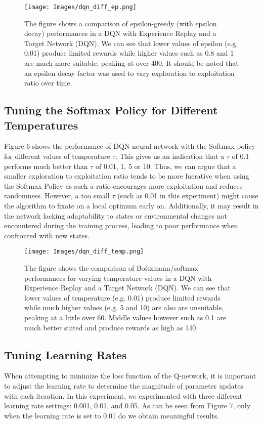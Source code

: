 \documentclass{article}
\begin{document}
\begin{figure}[H]
\centering
\texttt{[image: Images/dqn\_diff\_ep.png]}
\caption{\label{fig:Comparison of epsilon-greedy (with epsilon delay)} The figure shows a comparison of epsilon-greedy (with epsilon decay) performances in a DQN with Experience Replay and a Target Network (DQN). We can see that lower values of epsilon (e.g. 0.01) produce limited rewards while higher values such as 0.8 and 1 are much more suitable, peaking at over 400. It should be noted that an epsilon decay factor was used to vary exploration to exploitation ratio over time.}
\end{figure}

\subsection{Tuning the Softmax Policy for Different Temperatures}
Figure 6 shows the performance of DQN neural network with the Softmax policy for different values of temperature $\tau$. This gives us an indication that a $\tau$ of 0.1 performs much better than $\tau$ of 0.01, 1, 5 or 10. Thus, we can argue that a smaller exploration to exploitation ratio tends to be more lucrative when using the Softmax Policy as such a ratio encourages more exploitation and reduces randomness. 
However, a too small $\tau$ (such as 0.01 in this experiment) might cause the algorithm to fixate on a local optimum early on. Additionally, it may result in the network lacking adaptability to states or environmental changes not encountered during the training process, leading to poor performance when confronted with new states. \newline

\begin{figure}[htbp]
\centering
\texttt{[image: Images/dqn\_diff\_temp.png]}
\caption{\label{fig:Comparison of Boltzmann/Softmax Performances} The figure shows the comparison of Boltzmann/softmax performances for varying temperature values in a DQN with Experience Replay and a Target Network (DQN). We can see that lower values of temperature (e.g. 0.01) produce limited rewards while much higher values (e.g. 5 and 10) are also are unsuitable, peaking at a little over 60. Middle values however such as 0.1 are much better suited and produce rewards as high as 140.}
\end{figure}



\subsection{Tuning Learning Rates}
When attempting to minimize the loss function of the Q-network, it is important to adjust the learning rate to determine the magnitude of parameter updates with each iteration. In this experiment, we experimented with three different learning rate settings: 0.001, 0.01, and 0.05. As can be seen from Figure 7, only when the learning rate is set to 0.01 do we obtain meaningful results.\\
\end{document}
